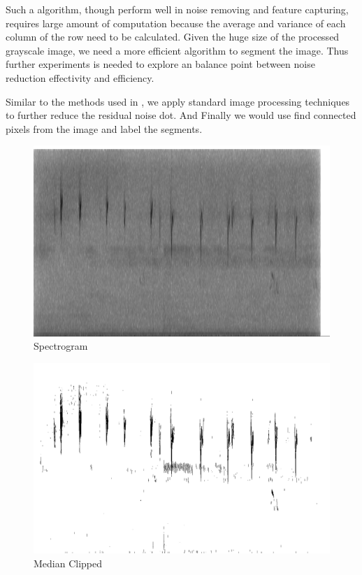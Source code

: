 \documentclass[12pt,peerreview,letterpaper]{IEEEtran}
\begin{document}
Such a algorithm, though perform well in noise removing and feature capturing, requires large amount of computation because the average and variance of each column of the row need to be calculated. Given the huge size of the processed grayscale image, we need a more efficient algorithm to segment the image. Thus further experiments is needed to explore an balance point between noise reduction effectivity and efficiency.

Similar to the methods used in \cite{Lasseck13}, we apply standard image processing techniques to further reduce the residual noise dot. And Finally we would use find connected pixels from the image and label the segments.

\begin{figure}[tb]
	\begin{center}
		\includegraphics[scale = 0.2]{"Cropped"}
	\end{center}
	\caption{Spectrogram}
	\label{fig:Spectrogram}
\end{figure}

\begin{figure}[tb]
	\begin{center}
		\includegraphics[scale = 0.2]{"Median_clipped"}
	\end{center}
	\caption{Median Clipped}
	\label{fig:Median Clipped}
\end{figure}
\end{document}
